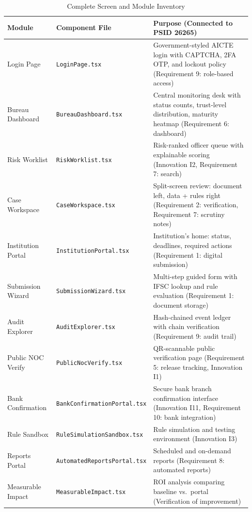 \documentclass[12pt, a4paper]{report}
\begin{document}
\begin{table}[H]
\centering
\caption{Complete Screen and Module Inventory}
\label{tab:modules}
\begin{tabularx}{\textwidth}{|l|l|X|}
\hline
\textbf{Module} & \textbf{Component File} & \textbf{Purpose (Connected to PSID 26265)} \\
\hline
Login Page & \texttt{LoginPage.tsx} & Government-styled AICTE login with CAPTCHA, 2FA OTP, and lockout policy (Requirement 9: role-based access) \\
\hline
Bureau Dashboard & \texttt{BureauDashboard.tsx} & Central monitoring desk with status counts, trust-level distribution, maturity heatmap (Requirement 6: dashboard) \\
\hline
Risk Worklist & \texttt{RiskWorklist.tsx} & Risk-ranked officer queue with explainable scoring (Innovation I2, Requirement 7: search) \\
\hline
Case Workspace & \texttt{CaseWorkspace.tsx} & Split-screen review: document left, data + rules right (Requirement 2: verification, Requirement 7: scrutiny notes) \\
\hline
Institution Portal & \texttt{InstitutionPortal.tsx} & Institution's home: status, deadlines, required actions (Requirement 1: digital submission) \\
\hline
Submission Wizard & \texttt{SubmissionWizard.tsx} & Multi-step guided form with IFSC lookup and rule evaluation (Requirement 1: document storage) \\
\hline
Audit Explorer & \texttt{AuditExplorer.tsx} & Hash-chained event ledger with chain verification (Requirement 9: audit trail) \\
\hline
Public NOC Verify & \texttt{PublicNocVerify.tsx} & QR-scannable public verification page (Requirement 5: release tracking, Innovation I1) \\
\hline
Bank Confirmation & \texttt{BankConfirmationPortal.tsx} & Secure bank branch confirmation interface (Innovation I11, Requirement 10: bank integration) \\
\hline
Rule Sandbox & \texttt{RuleSimulationSandbox.tsx} & Rule simulation and testing environment (Innovation I3) \\
\hline
Reports Portal & \texttt{AutomatedReportsPortal.tsx} & Scheduled and on-demand reports (Requirement 8: automated reports) \\
\hline
Measurable Impact & \texttt{MeasurableImpact.tsx} & ROI analysis comparing baseline vs.\ portal (Verification of improvement) \\
\hline
\end{tabularx}
\end{table}
\end{document}

